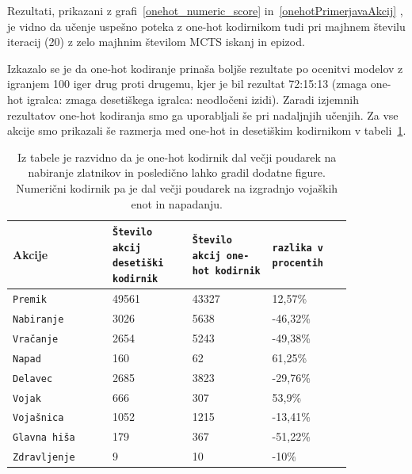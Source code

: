 \documentclass[a4paper, 12pt]{book}
\begin{document}
Rezultati, prikazani z grafi~\ref{onehot_numeric_score} in~\ref{onehotPrimerjavaAkcij} , je vidno da učenje uspešno poteka z one-hot kodirnikom tudi pri majhnem številu iteracij (20) z zelo majhnim številom MCTS iskanj in epizod.

Izkazalo se je da one-hot kodiranje prinaša boljše rezultate po ocenitvi modelov z igranjem 100 iger drug proti drugemu, kjer je bil rezultat 72:15:13 (zmaga one-hot igralca: zmaga desetiškega igralca: neodločeni izidi).
Zaradi izjemnih rezultatov one-hot kodiranja smo ga uporabljali še pri nadaljnjih učenjih.
Za vse akcije smo prikazali še razmerja med one-hot in desetiškim kodirnikom v tabeli~\ref{tableencoders}.

\begin{table}
	\begin{center}
		\begin{tabular}{p{0.25\linewidth}|p{0.2\linewidth}|p{0.2\linewidth}|p{0.2\linewidth}}
			Akcije             & {\tt Število akcij desetiški kodirnik} & {\tt Število akcij one-hot kodirnik} & {\tt razlika v procentih}\\ \hline
			{\tt Premik}       & 49561                   & 43327                      & 12,57\%                                           \\
			{\tt Nabiranje}    & 3026                    & 5638                       & -46,32\%                                          \\
			{\tt Vračanje}     & 2654                    & 5243                       & -49,38\%                                          \\
			{\tt Napad}        & 160                     & 62                         & 61,25\%                                           \\
			{\tt Delavec}      & 2685                    & 3823                       & -29,76\%                                          \\
			{\tt Vojak}        & 666                     & 307                        &53,9\%                                             \\
			{\tt Vojašnica}    & 1052                    & 1215                       & -13,41\%                                          \\
			{\tt Glavna hiša}  & 179                     & 367                        & -51,22\%                                          \\
			{\tt Zdravljenje}  & 9                       & 10                         & -10\%                                             \\
		\end{tabular}
	\end{center}
	\caption{Iz tabele je razvidno da je one-hot kodirnik dal večji poudarek na nabiranje zlatnikov in posledično lahko gradil dodatne figure.
	Numerični kodirnik pa je dal večji poudarek na izgradnjo vojaških enot in napadanju.}
	\label{tableencoders}
\end{table}
\end{document}

